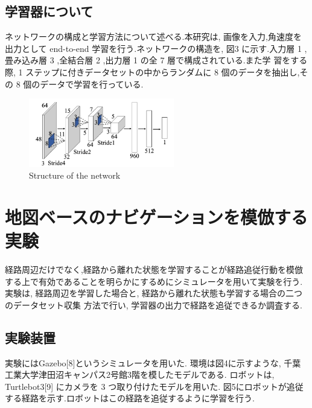 \documentclass{jarticle}
\begin{document}
\subsection{学習器について}
ネットワークの構成と学習方法について述べる.本研究は,
画像を入力,角速度を出力として end-to-end 学習を行う.ネットワークの構造を, 図3
に示す.入力層 1 ,畳み込み層 3 ,全結合層 2 ,出力層 1 の全 7 層で構成されている.また学
習をする際, 1 ステップに付きデータセットの中からランダムに 8 個のデータを抽出し,その
8 個のデータで学習を行っている.


\begin{figure}[h!]
  \centering
   \includegraphics[height=30mm]{./figs/gaku2.png}
   \caption{Structure of the network}
\end{figure}


\section{地図ベースのナビゲーションを模倣する実験}

経路周辺だけでなく,経路から離れた状態を学習することが経路追従行動を模倣
する上で有効であることを明らかにするめにシミュレータを用いて実験を行う. 
実験は, 経路周辺を学習した場合と, 経路から離れた状態も学習する場合の二つのデータセット収集
方法で行い, 学習器の出力で経路を追従できるか調査する.

\subsection{実験装置}
実験にはGazebo[8]というシミュレータを用いた.
環境は図4に示すような, 千葉工業大学津田沼キャンパス2号館3階を模したモデルである.
ロボットは,  Turtlebot3[9] にカメラを 3 つ取り付けたモデルを用いた. 
図5にロボットが追従する経路を示す.ロボットはこの経路を追従するように学習を行う.
\end{document}
